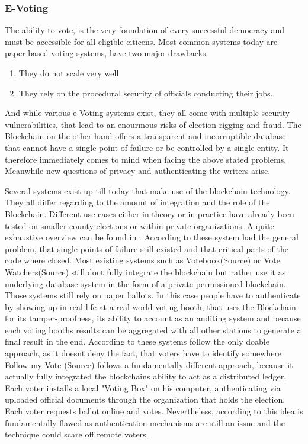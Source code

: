 \subsubsection{E-Voting}
The ability to vote, is the very foundation of every successful democracy and must be accessible for all eligible citicens. Most common systems today are paper-based voting systems, have two major drawbacks.
\begin{enumerate}
	\item They do not scale very well
	\item They rely on the procedural security of officials conducting their jobs.
\end{enumerate}

And while various e-Voting systems exist, they all come with multiple security vulnerabilities, that lead to an enourmous risks of election rigging and fraud. 
The Blockchain on the other hand offers a transparent and incorruptible database that cannot have a single point of failure or be controlled by a single entity. It therefore immediately comes to mind when facing the above stated problems. Meanwhile new questions of privacy and authenticating the writers arise.

Several systems exist up till today that make use of the blockchain technology. They all differ regarding to the amount of integration and the role of the Blockchain. Different use cases either in theory or in practice have already been tested on smaller county elections or within private organizations. A quite exhaustive overview can be found in \cite{BenAyed2017}. According to \citeauthor{BenAyed2017} these system had the general problem, that single points of failure still existed and that critical parts of the code where closed.
Most existing systems such as Votebook(Source) or Vote Watchers(Source) still dont fully integrate the blockchain but rather use it as underlying database system in the form of a private permissioned blockchain. Those systems still rely on paper ballots. In this case people have to authenticate by showing up in real life at a real world voting booth, that uses the Blockchain for its tamper-proofness, its ability to account as an auditing system and because each voting booths results can be aggregated with all other stations to generate a final result in the end.
According to \citeauthor{Osgood2016} these systems follow the only doable approach, as it doesnt deny the fact, that voters have to identify somewhere
Follow my Vote (Source) follows a fundamentally different approach, because it actually fully integrated the blockchains ability to act as a distributed ledger. Each voter installs a local "Voting Box" on his computer, authenticating via uploaded official documents through the organization that holds the election. Each voter requests ballot online and votes. Nevertheless, according to \citeauthor{Osgood2016} this idea is fundamentally flawed as authentication mechanisms are still an issue and the technique could scare off remote voters.

